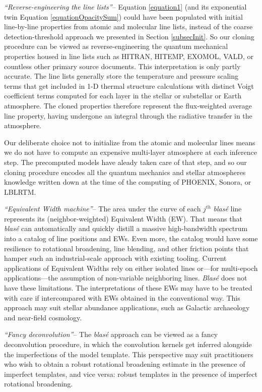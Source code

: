 \documentclass[trackchanges]{aastex631}
\begin{document}
\emph{``Reverse-engineering the line lists''}-- Equation \ref{equation1} (and its exponential twin Equation \ref{equationOpacitySum}) could have been populated with initial line-by-line properties from atomic and molecular line lists, instead of the coarse detection-threshold approach we presented in Section \ref{subsecInit}.  So our cloning procedure can be viewed as reverse-engineering the quantum mechanical properties housed in line lists such as HITRAN, HITEMP, EXOMOL, VALD, or countless other primary source documents.  This interpretation is only partly accurate.  The line lists generally store the temperature and pressure scaling terms that get included in 1-D thermal structure calculations with distinct Voigt coefficient terms computed for each layer in the stellar or substellar or Earth atmosphere.  The cloned properties therefore represent the flux-weighted average line property, having undergone an integral through the radiative transfer in the atmosphere.

Our deliberate choice not to initialize from the atomic and molecular lines means we do not have to compute an expensive multi-layer atmosphere at each inference step.  The precomputed models have aleady taken care of that step, and so our cloning procedure encodes all the quantum mechanics and stellar atmospheres knowledge written down at the time of the computing of PHOENIX, Sonora, or LBLRTM.


\emph{``Equivalent Width machine''}-- The area under the curve of each $j^{th}$  \emph{blas\'e} line represents its (neighbor-weighted) Equivalent Width (EW).  That means that  \emph{blas\'e} can automatically and quickly distill a massive high-bandwidth spectrum into a catalog of line positions and EWs.  Even more, the catalog would have some resilience to rotational broadening, line blending, and other friction points that hamper such an industrial-scale approach with existing tooling.  Current applications of Equivalent Widths rely on either isolated lines or---for multi-epoch applications---the assumption of non-variable neighboring lines.   \emph{Blas\'e} does not have these limitations.  The interpretations of these EWs may have to be treated with care if intercompared with EWs obtained in the conventional way.  This approach may suit stellar abundance applications, such as Galactic archaeology and near-field cosmology.

\emph{``Fancy deconvolution''}-- The  \emph{blas\'e} approach can be viewed as a fancy deconvolution procedure, in which the convolution kernels get inferred alongside the imperfections of the model template.  This perspective may suit practitioners who wish to obtain a robust rotational broadening estimate in the presence of imperfect templates, and vice versa: robust templates in the presence of imperfect rotational broadening.
\end{document}
